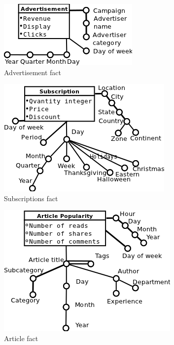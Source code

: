 
\begin{figure}[!hbp]
\begin{center}
  \includegraphics[scale=0.5]{fact_advertisement}
\caption{\label{pic:f_adv}  Advertisement fact}
\end{center}
\end{figure}

\begin{figure}[!hbp]
\begin{center}
    \includegraphics[scale=0.5]{fact_subscriptions}
\caption{\label{pic:f_sub}  Subscriptions fact}
\end{center}
\end{figure}

\begin{figure}[!hbp]
\begin{center}
  \includegraphics[scale=0.5]{fact_article}
\caption{\label{pic:f_art}  Article fact}
\end{center}
\end{figure}

